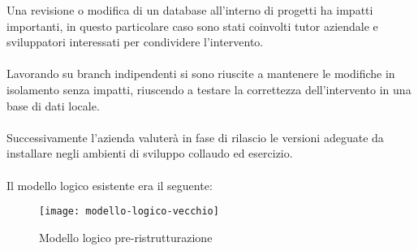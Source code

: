 Una revisione o modifica di un database all'interno di progetti ha impatti importanti, in questo
particolare caso sono stati coinvolti tutor aziendale e sviluppatori interessati per condividere
l'intervento. 
\\\\
Lavorando su branch indipendenti si sono riuscite a mantenere le modifiche 
in isolamento senza impatti, riuscendo a testare la correttezza dell'intervento in una base di dati locale.
\\\\
Successivamente l'azienda valuterà in fase di rilascio le versioni adeguate da installare
negli ambienti di sviluppo collaudo ed esercizio.
\\\\
\clearpage
Il modello logico esistente era il seguente:
\begin{figure}[H]
  \centering
  \texttt{[image: modello-logico-vecchio]}
  \caption{Modello logico pre-ristrutturazione}
\end{figure}

